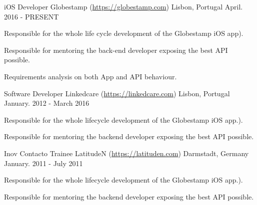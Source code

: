 

\begin{cventries}

  \cventry
    {iOS Developer} %
    {Globestamp (\hyperlink{Globestamp}{https://globestamp.com}) } %
    {Lisbon, Portugal} %
    {April. 2016 - PRESENT} %
    {
      \begin{cvitems} %
        \item {Responsible for the whole life cycle development of the Globestamp iOS app).}
        \item {Responsible for mentoring the back-end developer exposing the best API possible.}
        \item {Requirements analysis on both App and API behaviour.}
      \end{cvitems}
    }

  \cventry
	{Software Developer} %
    {Linkedcare (\hyperlink{linkedcare}{https://linkedcare.com}) } %
	{Lisbon, Portugal} %
	{January. 2012 - March 2016} %
	{
	 \begin{cvitems} %
		\item {Responsible for the whole lifecycle development of the Globestamp iOS app.).}
		\item {Responsible for mentoring the backend developer exposing the best API possible.}
	\end{cvitems}
	}

  \cventry
    {Inov Contacto Trainee } %
    {LatitudeN (\hyperlink{latitudeN}{https://latituden.com}) } %
    {Darmstadt, Germany} %
    {January. 2011 - July 2011} %
    {
	\begin{cvitems} %
      	\item {Responsible for the whole lifecycle development of the Globestamp iOS app.).}
		 \item {Responsible for mentoring the backend developer exposing the best API possible.}
	\end{cvitems}
}

\end{cventries}

